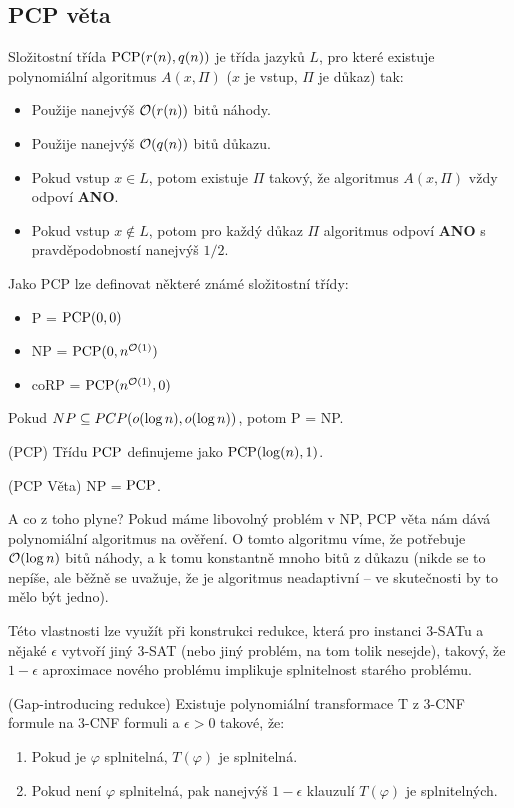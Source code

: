 \subsection{PCP věta}

\df Složitostní třída $\operatorname{PCP}(r(n), q(n))$ je třída jazyků $L$, pro které existuje
polynomiální algoritmus $A(x, \Pi)$ ($x$ je vstup, $\Pi$ je důkaz) tak:
\begin{itemize}
	\item Použije nanejvýš $\mathcal{O}(r(n))$ bitů náhody.
	\item Použije nanejvýš $\mathcal{O}(q(n))$ bitů důkazu.
	\item Pokud vstup $x \in L$, potom existuje $\Pi$ takový, že algoritmus
		$A(x, \Pi)$ vždy odpoví {\bf ANO}.
	\item Pokud vstup $x \notin L$, potom pro každý důkaz $\Pi$ algoritmus
		odpoví {\bf ANO} s pravděpodobností nanejvýš $1/2$.
\end{itemize}

\poz Jako PCP lze definovat některé známé složitostní třídy:
\begin{itemize}
	\item P = $\operatorname{PCP}(0,0)$
	\item NP = $\operatorname{PCP}(0, n^{\mathcal{O}(1)})$
	\item coRP = $\operatorname{PCP}(n^{\mathcal{O}(1)},0)$
\end{itemize}

\vt Pokud $NP \subseteq PCP(o(\log n), o(\log n))$, potom P = NP.

\df (PCP) Třídu $\operatorname{PCP}$ definujeme jako $\operatorname{PCP}(\log(n), 1)$.

\vt (PCP Věta) NP = $\operatorname{PCP}$.

A co z toho plyne? Pokud máme libovolný problém v NP, PCP věta nám dává
polynomiální algoritmus na ověření. O tomto algoritmu víme, že potřebuje
$\mathcal{O}(\log n)$ bitů náhody, a k tomu konstantně mnoho bitů z důkazu (nikde se to
nepíše, ale běžně se uvažuje, že je algoritmus neadaptivní -- ve skutečnosti by
to mělo být jedno).

Této vlastnosti lze využít při konstrukci redukce, která pro instanci $3$-SATu
a nějaké $\epsilon$ vytvoří jiný $3$-SAT (nebo jiný problém, na tom tolik
nesejde), takový, že $1-\epsilon$ aproximace nového problému implikuje
splnitelnost starého problému.

\vt (Gap-introducing redukce) Existuje polynomiální transformace T z $3$-CNF
formule na $3$-CNF formuli a $\epsilon > 0$ takové, že:
\begin{enumerate}
		\item Pokud je $\varphi$ splnitelná, $T(\varphi)$ je splnitelná.
		\item Pokud není $\varphi$ splnitelná, pak nanejvýš $1-\epsilon$
			klauzulí $T(\varphi)$ je splnitelných.
\end{enumerate}

